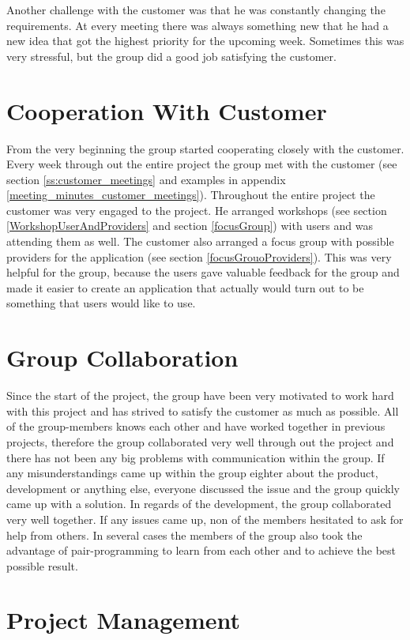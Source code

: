 Another challenge with the customer was that he was constantly changing the requirements. At every meeting there was always something new that he had a new idea that got the highest priority for the upcoming week. Sometimes this was very stressful, but the group did a good job satisfying the customer.  

\section{Cooperation With Customer}
From the very beginning the group started cooperating closely with the customer. Every week through out the entire project the group met with the customer (see section \ref{ss:customer_meetings} and examples in appendix \ref{meeting_minutes_customer_meetings}). Throughout the entire project the customer was very engaged to the project. He arranged workshops (see section \ref{WorkshopUserAndProviders} and section \ref{focusGroup}) with users and was attending them as well. The customer also arranged a focus group with possible providers for the application (see section \ref{focusGrouoProviders}). This was very helpful for the group, because the users gave valuable feedback for the group and made it easier to create an application that actually would turn out to be something that users would like to use. 

\section{Group Collaboration}
Since the start of the project, the group have been very motivated to work hard with this project and has strived to satisfy the customer as much as possible. All of the group-members knows each other and have worked together in previous projects, therefore the group collaborated very well through out the project and there has not been any big problems with communication within the group. If any misunderstandings came up within the group eighter about the product, development or anything else, everyone discussed the issue and the group quickly came up with a solution. In regards of the development, the group collaborated very well together. If any issues came up, non of the members hesitated to ask for help from others. In several cases the members of the group also took the advantage of pair-programming to learn from each other and to achieve the best possible result.

\section{Project Management}
